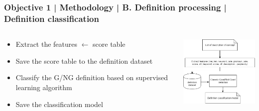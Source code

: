 \documentclass{beamer}
\begin{document}
\begin{frame}
\frametitle{Objective 1 | Methodology | B. Definition processing | Definition classification}
\begin{columns}

	\begin{column}{.55\textwidth}
		\begin{itemize}
			\item Extract the features $\leftarrow$ score table
			\item Save the score table to the definition dataset
			\item Classify the G/NG definition based on supervised learning algorithm
			\item Save the classification model
		\end{itemize}
	
	\end{column}
	\begin{column}{.55\textwidth}
	\includegraphics[width=50mm]{dc1.png}
\end{column}
	
	
\end{columns}
\end{frame}
\end{document}

